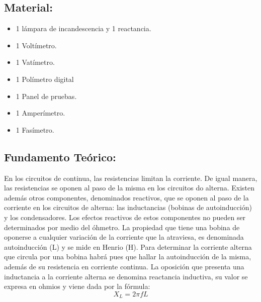 \documentclass[spanish,openany]{report}
\begin{document}
\subsection*{Material:}
\begin{minipage}[t]{0.48\textwidth}
\begin{itemize}[label={\textbullet}, leftmargin=*, nosep]
\item 1 lámpara de incandescencia y 1 reactancia.
\item 1 Voltímetro.
\item 1 Vatímetro.
\item 1 Polímetro digital
\end{itemize}
\end{minipage}%
\hfill
\begin{minipage}[t]{0.48\textwidth}
\begin{itemize}[label={\textbullet}, leftmargin=*, nosep]
\item 1 Panel de pruebas.
\item 1 Amperímetro.
\item 1 Fasímetro.
\end{itemize}
\end{minipage}

\subsection*{Fundamento Teórico:}
En los circuitos de continua, las resistencias limitan la corriente. De igual manera,
las resistencias se oponen al paso de la misma en los circuitos do alterna. Existen además 
otros componentes, denominados reactivos, que se oponen al paso de la corriente en los 
circuitos de alterna: las inductancias (bobinas de autoinducción) y los condensadores. 
Los efectos reactivos de estos componentes no pueden ser determinados por medio del óhmetro.
La propiedad que tiene una bobina de oponerse a cualquier variación de la corriente que la 
atraviesa, es denominada autoinducción (L) y se mide en Henrio (H).
Para determinar la corriente alterna que circula por una bobina habrá pues que hallar la 
autoinducción de la misma, además de su resistencia en corriente continua. 
La oposición que presenta una inductancia a la corriente alterna se denomina reactancia inductiva, 
su valor se expresa en ohmios y viene dada por la fórmula: 
\[
	X_{L} = 2\pi fL
\]
\end{document}
